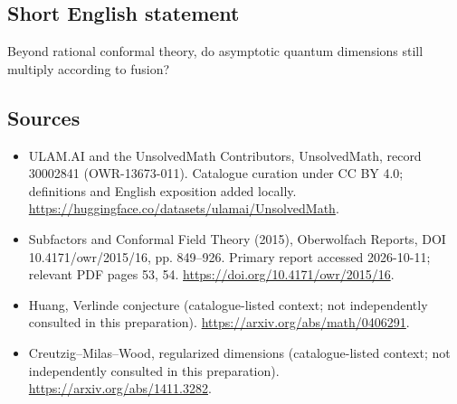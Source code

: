 \documentclass[11pt]{article}
\begin{document}
\subsection{Short English statement}
Beyond rational conformal theory, do asymptotic quantum dimensions still multiply according to fusion?
\subsection{Sources}
\begin{itemize}
\item[\hypertarget{source:30002841:1}{S1}] ULAM.AI and the UnsolvedMath Contributors, UnsolvedMath, record 30002841 (OWR-13673-011). Catalogue curation under CC BY 4.0; definitions and English exposition added locally.
\url{https://huggingface.co/datasets/ulamai/UnsolvedMath}.
\item[\hypertarget{source:30002841:2}{S2}] Subfactors and Conformal Field Theory (2015), Oberwolfach Reports, DOI 10.4171/owr/2015/16, pp. 849--926. Primary report accessed 2026-10-11; relevant PDF pages 53, 54.
\url{https://doi.org/10.4171/owr/2015/16}.
\item[\hypertarget{source:30002841:3}{S3}] Huang, Verlinde conjecture (catalogue-listed context; not independently consulted in this preparation).
\url{https://arxiv.org/abs/math/0406291}.
\item[\hypertarget{source:30002841:4}{S4}] Creutzig--Milas--Wood, regularized dimensions (catalogue-listed context; not independently consulted in this preparation).
\url{https://arxiv.org/abs/1411.3282}.
\end{itemize}
\label{end:30002841}
\end{document}
